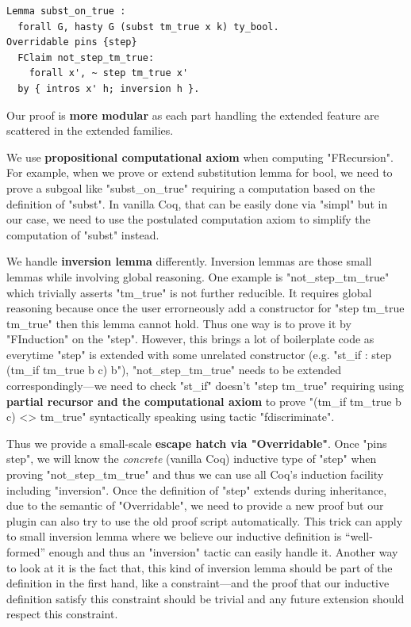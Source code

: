 \begin{verbatim}
Lemma subst_on_true :
  forall G, hasty G (subst tm_true x k) ty_bool.
Overridable pins {step}
  FClaim not_step_tm_true:
    forall x', ~ step tm_true x' 
  by { intros x' h; inversion h }.
\end{verbatim}

Our proof is \textbf{more modular} as each part handling the extended feature are scattered in the extended families.


We use \textbf{propositional computational axiom} when computing "FRecursion". For example, when we prove or extend substitution lemma for bool, we need to prove a subgoal like "subst_on_true" requiring a computation based on the definition of "subst". In vanilla Coq, that can be easily done via "simpl" but in our case, we need to use the postulated computation axiom to simplify the computation of "subst" instead.

We handle \textbf{inversion lemma} differently. Inversion lemmas are those small lemmas while involving global reasoning. One example is "not_step_tm_true" which trivially asserts "tm_true" is not further reducible. It requires global reasoning because once the user errorneously add a constructor for "step tm_true tm_true" then this lemma cannot hold. Thus one way is to prove it by "FInduction" on the "step".  However, this brings a lot of boilerplate code as everytime "step" is extended with some unrelated constructor (e.g. "st_if : step (tm_if tm_true b c) b"), "not_step_tm_true" needs to be extended correspondingly---we need to check "st_if" doesn't "step tm_true" requiring using \textbf{partial recursor and the computational axiom} to prove "(tm_if tm_true b c) <> tm_true" syntactically speaking using tactic "fdiscriminate".

Thus we provide a small-scale \textbf{escape hatch via "Overridable"}. Once "pins {step}", we will know the \textit{concrete} (vanilla Coq) inductive type of "step" when proving "not_step_tm_true" and thus we can use all Coq's induction facility including "inversion". Once the definition of "step" extends during inheritance, due to the semantic of "Overridable", we need to provide a new proof but our plugin can also try to use the old proof script automatically. This trick can apply to small inversion lemma where we believe our inductive definition is ``well-formed'' enough and thus an "inversion" tactic can easily handle it. Another way to look at it is the fact that, this kind of inversion lemma should be part of the definition in the first hand, like a constraint---and the proof that our inductive definition satisfy this constraint should be trivial and any future extension should respect this constraint.

